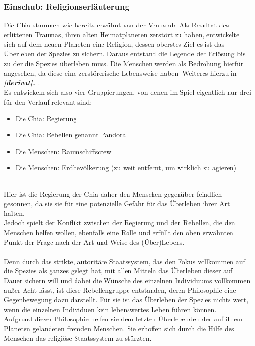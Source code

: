 \documentclass[12pt]{article}
\begin{document}
	\subsubsection{Einschub: Religionserläuterung}
		Die Chia stammen wie bereits erwähnt von der Venus ab. Als Resultat des erlittenen Traumas, ihren alten Heimatplaneten zerstört zu haben, entwickelte sich auf dem neuen Planeten eine Religion, dessen oberstes Ziel es ist das Überleben der Spezies zu sichern. Daraus entstand die Legende der Erlösung bis zu der die Spezies überleben muss. Die Menschen werden als Bedrohung hierfür angesehen, da diese eine zerstörerische Lebensweise haben. Weiteres hierzu in \textbf{\textit{\hyperref[derivat]{\ref{derivat}. }}}.
	\\Es entwickeln sich also vier Gruppierungen, von denen im Spiel eigentlich nur drei für den Verlauf relevant sind:
	\begin{itemize}
		\item Die Chia: Regierung
		\item Die Chia: Rebellen genannt Pandora
		\item Die Menschen: Raumschiffscrew
		\item Die Menschen: Erdbevölkerung (zu weit entfernt, um wirklich zu agieren)
	\end{itemize}\mbox{}\\
	Hier ist die Regierung der Chia daher den Menschen gegenüber feindlich gesonnen, da sie sie für eine potenzielle Gefahr für das Überleben ihrer Art halten.\\
	Jedoch spielt der Konflikt zwischen der Regierung und den Rebellen, die den Menschen helfen wollen, ebenfalls eine Rolle und erfüllt den oben erwähnten Punkt der Frage nach der Art und Weise des (Über)Lebens.\\
	\\
	Denn durch das strikte, autoritäre Staatssystem, das den Fokus vollkommen auf die Spezies als ganzes gelegt hat, mit allen Mitteln das Überleben dieser auf Dauer sichern will und dabei die Wünsche des einzelnen Individuums vollkommen außer Acht lässt, ist diese Rebellengruppe entstanden, deren Philosophie eine Gegenbewegung dazu darstellt. Für sie ist das Überleben der Spezies nichts wert, wenn die einzelnen Individuen kein lebenswertes Leben führen können.\\
	Aufgrund dieser Philosophie helfen sie dem letzten Überlebenden der auf ihrem Planeten gelandeten fremden Menschen. Sie erhoffen sich durch die Hilfe des Menschen das religiöse Staatssystem zu stürzten.\\
\end{document}
